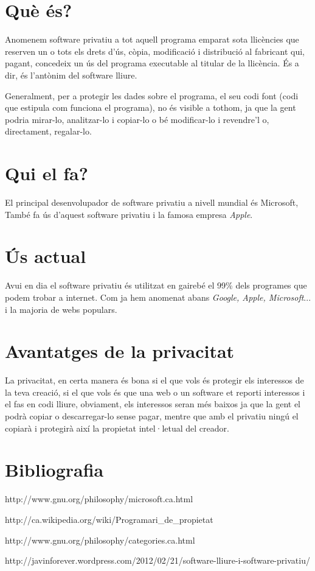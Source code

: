 \section{Què és?}

Anomenem software privatiu a tot aquell programa emparat sota llicències
que reserven un o tots els drets d'ús, còpia, modificació i distribució
al fabricant qui, pagant, concedeix un ús del programa executable al titular
de la llicència. És a dir, és l'antònim del software lliure.

Generalment, per a protegir les dades sobre el programa, el seu codi font
(codi que estipula com funciona el programa), no és visible a tothom, ja 
que la gent podria mirar-lo, analitzar-lo i copiar-lo o bé modificar-lo i
revendre'l o, directament, regalar-lo.

\section{Qui el fa?}

El principal desenvolupador de software privatiu a nivell mundial és Microsoft, 
També fa ús d'aquest software privatiu i la famosa empresa
\emph{Apple}.

\section{Ús actual}

Avui en dia el software privatiu és utilitzat en gairebé el 99\% dels programes que
podem trobar a internet. Com ja hem anomenat abans \emph{Google, Apple, Microsoft}...
i la majoria de webs populars.

\section{Avantatges de la privacitat}

La privacitat, en certa manera és bona si el que vols és protegir els interessos de
la teva creació, si el que vols és que una web o un software et reporti interessos 
i el fas en codi lliure, obviament, els interessos seran més baixos ja que la gent 
el podrà copiar o descarregar-lo sense pagar, mentre que amb el privatiu ningú el
copiarà i protegirà així la propietat intel·letual del creador.

\section{Bibliografia}

http://www.gnu.org/philosophy/microsoft.ca.html

http://ca.wikipedia.org/wiki/Programari\_de\_propietat

http://www.gnu.org/philosophy/categories.ca.html

http://javinforever.wordpress.com/2012/02/21/software-lliure-i-software-privatiu/

